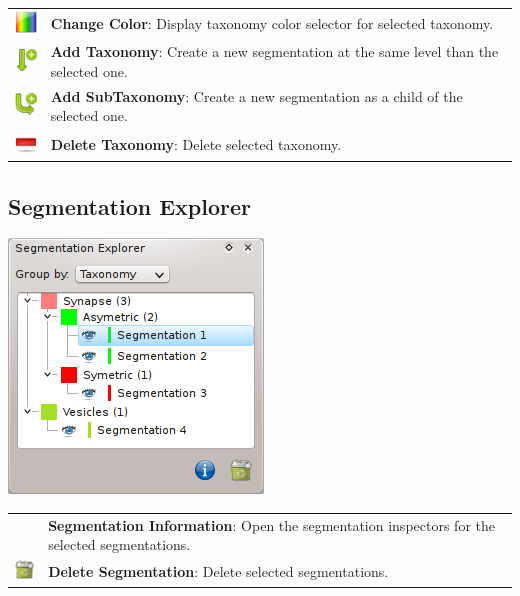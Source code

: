 \begin{tabular}{m{0.8cm} m{13cm}}
\includegraphics[width=0.7cm]{../../frontend/rsc/rainbow} &
\textbf{Change Color}: Display taxonomy color selector for selected taxonomy.\\
\includegraphics[width=0.7cm]{../../frontend/rsc/create_node} &
\textbf{Add Taxonomy}: Create a new segmentation at the same level than the
selected one.\\
\includegraphics[width=0.7cm]{../../frontend/rsc/create_subnode} &
\textbf{Add SubTaxonomy}: Create a new segmentation as a child of the selected
one.\\
\includegraphics[width=0.7cm]{../../frontend/rsc/remove} &
\textbf{Delete Taxonomy}: Delete selected taxonomy.
\end{tabular}
\vspace{0.3cm}

\subsection{Segmentation Explorer}

\begin{center}
\includegraphics{fig/SegmentationExplorer}
\end{center}

\begin{tabular}{m{0.8cm} m{13cm}}
 & %
\textbf{Segmentation Information}: Open the segmentation inspectors for the
selected segmentations.\\
\includegraphics[width=0.7cm]{../../frontend/rsc/trash-full} &
\textbf{Delete Segmentation}: Delete selected segmentations.
\end{tabular}
\vspace{0.3cm}

